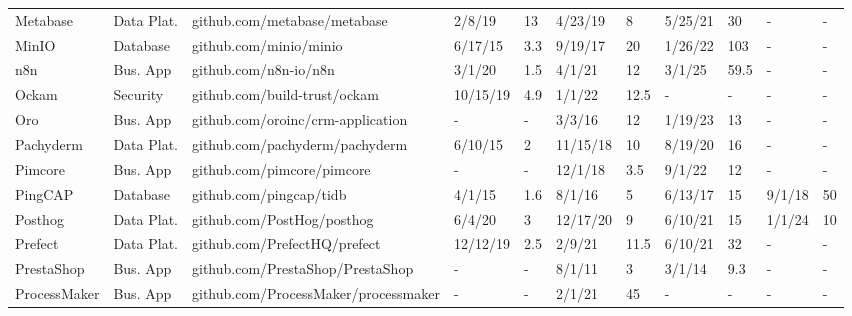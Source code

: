 \begin{landscape}
\begin{table}[htbp]
\begin{tabular}{|p{2.2cm}|p{1.6cm}|p{4cm}|p{1.1cm}|p{0.9cm}|p{1.1cm}|p{0.9cm}|p{1.1cm}|p{0.9cm}|p{1.1cm}|p{0.9cm}|}
Metabase & Data Plat. & github.com/metabase/metabase & 2/8/19 & 13 & 4/23/19 & 8 & 5/25/21 & 30 & - & - \\
MinIO & Database & github.com/minio/minio & 6/17/15 & 3.3 & 9/19/17 & 20 & 1/26/22 & 103 & - & - \\
n8n & Bus. App & github.com/n8n-io/n8n & 3/1/20 & 1.5 & 4/1/21 & 12 & 3/1/25 & 59.5 & - & - \\
Ockam & Security & github.com/build-trust/ockam & 10/15/19 & 4.9 & 1/1/22 & 12.5 & - & - & - & - \\
Oro & Bus. App & github.com/oroinc/crm-application & - & - & 3/3/16 & 12 & 1/19/23 & 13 & - & - \\
Pachyderm & Data Plat. & github.com/pachyderm/pachyderm & 6/10/15 & 2 & 11/15/18 & 10 & 8/19/20 & 16 & - & - \\
Pimcore & Bus. App & github.com/pimcore/pimcore & - & - & 12/1/18 & 3.5 & 9/1/22 & 12 & - & - \\
PingCAP & Database & github.com/pingcap/tidb & 4/1/15 & 1.6 & 8/1/16 & 5 & 6/13/17 & 15 & 9/1/18 & 50 \\
Posthog & Data Plat. & github.com/PostHog/posthog & 6/4/20 & 3 & 12/17/20 & 9 & 6/10/21 & 15 & 1/1/24 & 10 \\
Prefect & Data Plat. & github.com/PrefectHQ/prefect & 12/12/19 & 2.5 & 2/9/21 & 11.5 & 6/10/21 & 32 & - & - \\
PrestaShop & Bus. App & github.com/PrestaShop/PrestaShop & - & - & 8/1/11 & 3 & 3/1/14 & 9.3 & - & - \\
ProcessMaker & Bus. App & github.com/ProcessMaker/processmaker & - & - & 2/1/21 & 45 & - & - & - & - \\
\hline
\end{tabular}
\end{table}

\clearpage


\end{landscape}

